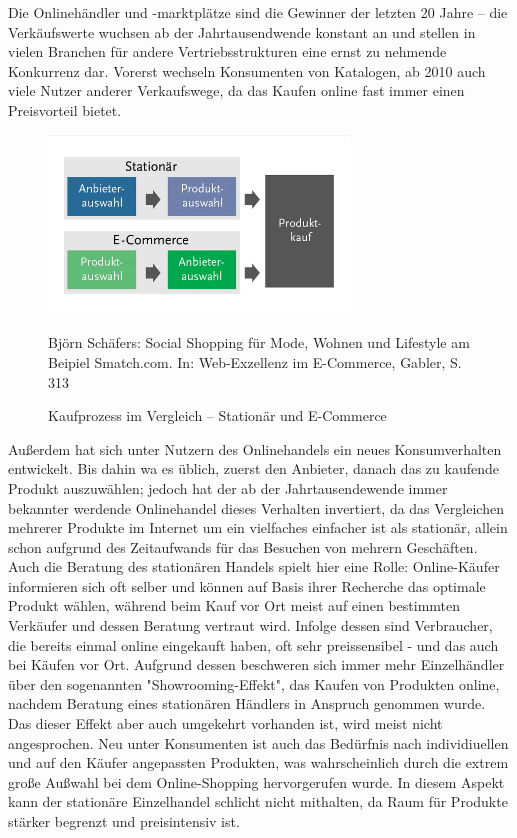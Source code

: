 \begin{folding} %

Die Onlinehändler und -marktplätze sind die Gewinner der letzten 20 Jahre – die Verkäufswerte wuchsen ab der Jahrtausendwende konstant an und stellen in vielen Branchen für andere Vertriebsstrukturen eine ernst zu nehmende Konkurrenz dar\cite{wolf}. Vorerst wechseln Konsumenten von Katalogen, ab 2010 auch viele Nutzer anderer Verkaufswege, da das Kaufen online fast immer einen Preisvorteil bietet\cite[S. 31]{Graf}.
\begin{figure}[h]
    \begin{center}
        \includegraphics[width=8cm]{media/Fabian-konsumwandel.png}
        \caption{Kaufprozess im Vergleich – Stationär und E-Commerce}
        \label{konsumwandel}
        \bildquelle Björn Schäfers: Social Shopping für Mode, Wohnen und Lifestyle am Beipiel Smatch.com. In: Web-Exzellenz im E-Commerce, Gabler, S. 313 %
    \end{center}
\end{figure} 
Außerdem hat sich unter Nutzern des Onlinehandels ein neues Konsumverhalten entwickelt. Bis dahin wa es üblich, zuerst den Anbieter, danach das zu kaufende Produkt auszuwählen; jedoch hat der ab der Jahrtausendewende immer bekannter werdende Onlinehandel dieses Verhalten invertiert, da das Vergleichen mehrerer Produkte im Internet um ein vielfaches einfacher ist als stationär, allein schon aufgrund des Zeitaufwands für das Besuchen von mehrern Geschäften\cite[S 22f]{Graf}. Auch die Beratung des stationären Handels spielt hier eine Rolle: Online-Käufer informieren sich oft selber und können auf Basis ihrer Recherche das optimale Produkt wählen, während beim Kauf vor Ort meist auf einen bestimmten Verkäufer und dessen Beratung vertraut wird\cite[S. 15f]{evilcom}. Infolge dessen sind Verbraucher, die bereits einmal online eingekauft haben, oft sehr preissensibel - und das auch bei Käufen vor Ort\cite[S. 60]{Nitt}. Aufgrund dessen beschweren sich immer mehr Einzelhändler über den sogenannten "Showrooming-Effekt", das Kaufen von Produkten online, nachdem Beratung eines stationären Händlers in Anspruch genommen wurde. Das dieser Effekt aber auch umgekehrt vorhanden ist, wird meist nicht angesprochen\cite[S. 21f]{evilcom}.
Neu unter Konsumenten ist auch das Bedürfnis nach individiuellen und auf den Käufer angepassten Produkten\cite[S. 43]{Nitt}, was wahrscheinlich durch die extrem große Außwahl bei dem Online-Shopping hervorgerufen wurde. In diesem Aspekt kann der stationäre Einzelhandel schlicht nicht mithalten, da Raum für Produkte stärker begrenzt und preisintensiv ist.

\end{folding}


